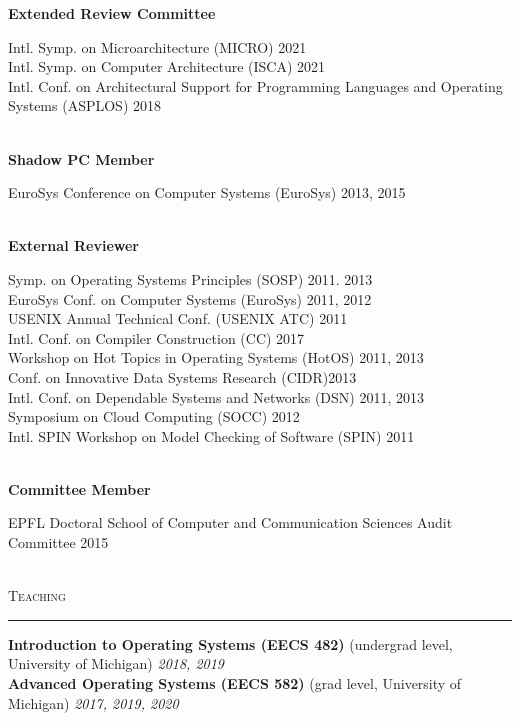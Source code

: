 \documentclass[10pt]{article}
\newcommand{\mysec}[1]{\vspace{2em}\textsc{\large #1}\vspace{1mm}\hrule\vspace{2mm}}
\newcommand{\mysub}[3]{\textbf{#1} {#2} \hfill {\em #3}}
\newcommand{\myssub}[1]{\hspace*{2mm}\parbox{163mm}{#1}\vspace*{2mm}}
\begin{document}
\mysub{Extended Review Committee}{}{}\\
\myssub{\vspace{2mm}
  Intl. Symp. on Microarchitecture (MICRO) \hfill 2021 \\
  Intl. Symp. on Computer Architecture (ISCA) \hfill 2021 \\
  Intl. Conf. on Architectural Support for Programming Languages and Operating Systems (ASPLOS) \hfill 2018 \\
}\\

\mysub{Shadow PC Member}{}{} \\ 
\myssub{\vspace{2mm}EuroSys Conference on Computer Systems (EuroSys) \hfill 2013, 2015} \\

\mysub{External Reviewer}{}{} \\ 
\myssub{\vspace{2mm}Symp. on Operating Systems Principles (SOSP) \hfill 2011. 2013 \\
EuroSys Conf. on Computer Systems (EuroSys) \hfill 2011, 2012 \\
USENIX Annual Technical Conf. (USENIX ATC) \hfill 2011 \\
Intl. Conf. on Compiler Construction (CC) \hfill 2017 \\
Workshop on Hot Topics in Operating Systems (HotOS) \hfill 2011, 2013 \\
Conf. on Innovative Data Systems Research (CIDR)\hfill 2013\\
Intl. Conf. on Dependable Systems and Networks (DSN) \hfill 2011, 2013 \\
Symposium on Cloud Computing (SOCC) \hfill 2012 \\
Intl. SPIN Workshop on Model Checking of Software (SPIN) \hfill 2011} \\

\mysub{Committee Member}{}{} \\
\myssub{\vspace{2mm}EPFL Doctoral School of Computer and Communication Sciences Audit Committee \hfill 2015}\\

\mysec{Teaching}
\mysub{Introduction to Operating Systems (EECS 482)}{(undergrad level, University of Michigan)}{\rm 2018, 2019\vspace{2mm}} \\
\mysub{Advanced Operating Systems (EECS 582)}{(grad level, University of Michigan)}{\rm 2017, 2019, 2020\vspace{2mm}} 
\end{document}
